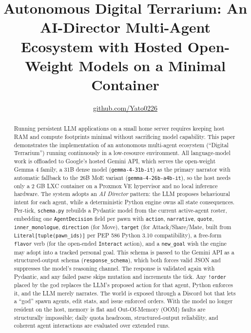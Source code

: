 \documentclass[10pt,a4paper]{article}
\begin{document}
\title{\textbf{Autonomous Digital Terrarium: An AI-Director Multi-Agent Ecosystem with Hosted Open-Weight Models on a Minimal Container}}
\author{\href{https://github.com/Yato0226}{github.com/Yato0226}}
\maketitle

\begin{abstract}
Running persistent LLM applications on a small home server requires keeping host RAM and compute footprints minimal without sacrificing model capability. This paper demonstrates the implementation of an autonomous multi-agent ecosystem (``Digital Terrarium'') running continuously in a low-resource environment. All language-model work is offloaded to Google's hosted Gemini API, which serves the open-weight Gemma 4 family, a 31B dense model (\texttt{gemma-4-31b-it}) as the primary narrator with automatic fallback to the 26B MoE variant (\texttt{gemma-4-26b-a4b-it}), so the host needs only a 2 GB LXC container on a Proxmox VE hypervisor and no local inference hardware. The system adopts an \emph{AI Director} pattern: the LLM proposes behavioural intent for each agent, while a deterministic Python engine owns all state consequences. Per-tick, \texttt{schema.py} rebuilds a Pydantic model from the current active-agent roster, embedding one \texttt{AgentDecision} field per pawn with \texttt{action}, \texttt{narrative}, \texttt{quote}, \texttt{inner\_monologue}, \texttt{direction} (for Move), \texttt{target} (for Attack/Share/Mate, built from \texttt{Literal[tuple(pawn\_ids)]} per PEP 586 Python 3.10 compatibility), a free-form \texttt{flavor} verb (for the open-ended \texttt{Interact} action), and a \texttt{new\_goal} wish the engine may adopt into a tracked personal goal. This schema is passed to the Gemini API as a structured-output schema (\texttt{response\_schema}), which both forces valid JSON and suppresses the model's reasoning channel. The response is validated again with Pydantic, and any failed parse skips mutation and increments the tick. Any \texttt{!order} placed by the god replaces the LLM's proposed action for that agent, Python enforces it, and the LLM merely narrates. The world is exposed through a Discord bot that lets a ``god'' spawn agents, edit stats, and issue enforced orders. With the model no longer resident on the host, memory is flat and Out-Of-Memory (OOM) faults are structurally impossible; daily quota headroom, structured-output reliability, and coherent agent interactions are evaluated over extended runs.
\end{abstract}
\end{document}
